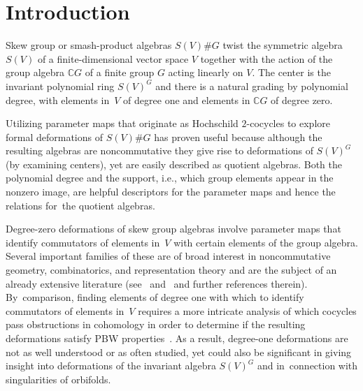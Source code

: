 \documentclass[pdftex]{sigma}
\numberwithin{equation}{section}
\begin{document}


\section{Introduction}%

Skew group or smash-product algebras $S(V)\# G$ twist the symmetric algebra $S(V)$ of a
finite-dimensional vector space $V$ together with the action of the group algebra $\mathbb{C} G$
of a finite group $G$ acting linearly on $V$. The center is the invariant polynomial ring
$S(V)^G$ and there is a natural grading by polynomial degree, with elements in~$V$ of
degree one and elements in $\mathbb{C} G$ of degree zero.

Utilizing parameter maps that originate as Hochschild $2$-cocycles to explore formal
deformations of $S(V) \# G$ has proven useful because although the resulting algebras
are noncommutative they give rise to deformations of $S(V)^G$ (by examining centers),
yet are easily described
as quotient algebras. Both the polynomial degree and the support, i.e., which group elements
appear in the nonzero image, are helpful descriptors for the parameter maps and hence
the relations for~the quotient algebras.

Degree-zero deformations of skew group algebras involve parameter maps that
identify commutators of elements in~$V$ with certain elements of the
group algebra. Several important families of these are of broad
interest in noncommutative geometry, combinatorics, and representation theory
and are the subject of an already extensive literature (see~\cite{Gordon2008}
and~\cite{Gordon2010} and further references therein). By~comparison, finding elements of degree one with which to identify commutators
of elements in~$V$ requires a more intricate analysis of which cocycles pass obstructions in
cohomology in order to determine if the resulting deformations satisfy PBW properties~\cite{FGK, SWorbifold}.
As a result, degree-one deformations are not as well understood or as often studied, yet
could also be significant in giving insight into deformations of the invariant algebra
$S(V)^G$ and in~con\-nection with singularities of orbifolds.
\end{document}
